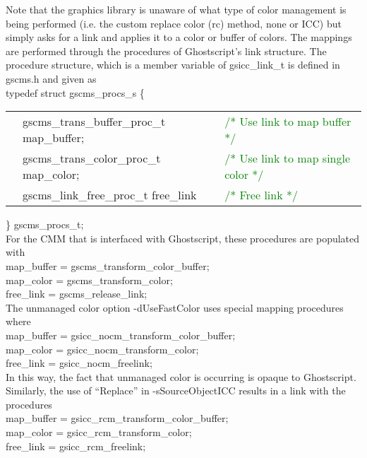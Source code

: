 \documentclass[12pt,notitlepage]{article}
\begin{document}
Note that the graphics library is unaware of what type of color management is being performed (i.e. the custom replace color (rc) method, none or ICC) but simply asks for a link and applies it to a color or buffer of colors.
The mappings are performed through the procedures of Ghostscript's link structure. The procedure structure, which is a member variable of gsicc\_link\_t is defined in gscms.h and given as\\

\noindent typedef struct gscms\_procs\_s \{

\begin{tabular}{lll}
  & gscms\_trans\_buffer\_proc\_t map\_buffer;   & 	\textcolor{green}{/* Use link to map buffer */}  \\
  & gscms\_trans\_color\_proc\_t  map\_color;   & 	\textcolor{green}{/* Use link to map single color */}   \\
  & gscms\_link\_free\_proc\_t free\_link    &	 \textcolor{green}{/* Free link */}    \\
\end{tabular}

\noindent  \} gscms\_procs\_t;\\

For the CMM that is interfaced with Ghostscript, these procedures are populated with\\

\noindent map\_buffer = gscms\_transform\_color\_buffer;\\
map\_color = gscms\_transform\_color;\\
free\_link = gscms\_release\_link;\\

The unmanaged color option -dUseFastColor uses special mapping procedures where\\

\noindent map\_buffer = gsicc\_nocm\_transform\_color\_buffer;\\
map\_color = gsicc\_nocm\_transform\_color;\\
free\_link = gsicc\_nocm\_freelink;\\

In this way, the fact that unmanaged color is occurring is opaque to Ghostscript.   Similarly, the use of ``Replace'' in -sSourceObjectICC results in a link with the procedures\\

\noindent map\_buffer = gsicc\_rcm\_transform\_color\_buffer;\\
map\_color = gsicc\_rcm\_transform\_color;\\
free\_link = gsicc\_rcm\_freelink;\\
\end{document}
